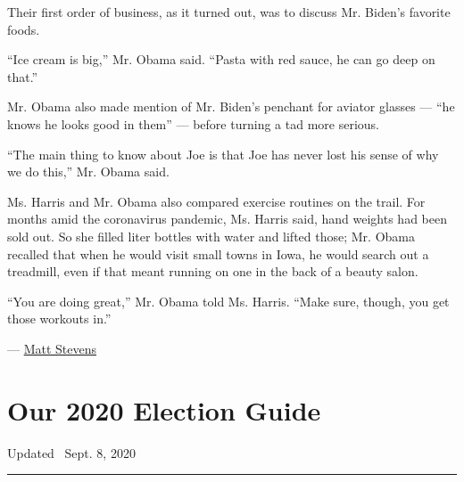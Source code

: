 Their first order of business, as it turned out, was to discuss Mr.
Biden's favorite foods.

``Ice cream is big,'' Mr. Obama said. ``Pasta with red sauce, he can go
deep on that.''

Mr. Obama also made mention of Mr. Biden's penchant for aviator glasses
--- ``he knows he looks good in them'' --- before turning a tad more
serious.

``The main thing to know about Joe is that Joe has never lost his sense
of why we do this,'' Mr. Obama said.

Ms. Harris and Mr. Obama also compared exercise routines on the trail.
For months amid the coronavirus pandemic, Ms. Harris said, hand weights
had been sold out. So she filled liter bottles with water and lifted
those; Mr. Obama recalled that when he would visit small towns in Iowa,
he would search out a treadmill, even if that meant running on one in
the back of a beauty salon.

``You are doing great,'' Mr. Obama told Ms. Harris. ``Make sure, though,
you get those workouts in.''

--- \href{https://www.nytimes3xbfgragh.onion/by/matt-stevens}{Matt
Stevens}

\hypertarget{our-2020-election-guide}{%
\section{Our 2020 Election Guide}\label{our-2020-election-guide}}

Updated ~Sept. 8, 2020

\begin{center}\rule{0.5\linewidth}{\linethickness}\end{center}


